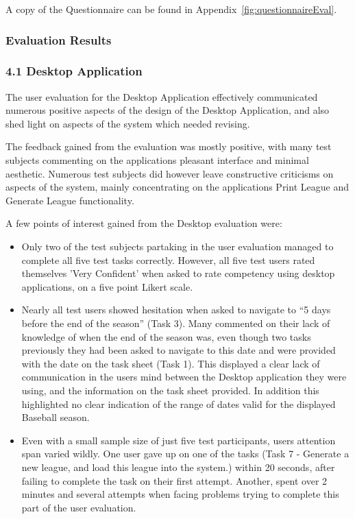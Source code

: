 A copy of the Questionnaire can be found in
Appendix~\ref{fig:questionnaireEval}.

\subsubsection{Evaluation Results}

\subsubsection{4.1 Desktop Application}

The user evaluation for the Desktop Application effectively communicated
numerous positive aspects of the design of the Desktop Application, and also
shed light on aspects of the system which needed revising.

The feedback gained from the evaluation was mostly positive, with many test
subjects commenting on the applications pleasant interface and minimal
aesthetic. Numerous test subjects did however leave constructive criticisms on
aspects of the system, mainly concentrating on the applications Print League
and Generate League functionality.

A few points of interest gained from the Desktop evaluation were:

\begin{itemize}
\item Only two of the test subjects partaking in the user evaluation managed to
complete all five test tasks correctly. However, all five test users rated
themselves 'Very Confident' when asked to rate competency using desktop
applications, on a five point Likert scale.
\item Nearly all test users showed hesitation when asked to navigate to ``5
days before the end of the season'' (Task 3). Many commented on their lack of
knowledge of when the end of the season was, even though two tasks previously
they had been asked to navigate to this date and were provided with the date on
the task sheet (Task 1). This displayed a clear lack of communication in the
users mind between the Desktop application they were using, and the information
on the task sheet provided. In addition this highlighted no clear indication of
the range of dates valid for the displayed Baseball season.
\item Even with a small sample size of just five test participants, users
attention span varied wildly. One user gave up on one of the tasks (Task 7 -
Generate a new league, and load this league into the system.) within 20
seconds, after failing to complete the task on their first attempt. Another,
spent over 2 minutes and several attempts when facing problems trying to
complete this part of the user evaluation.
\end{itemize}

